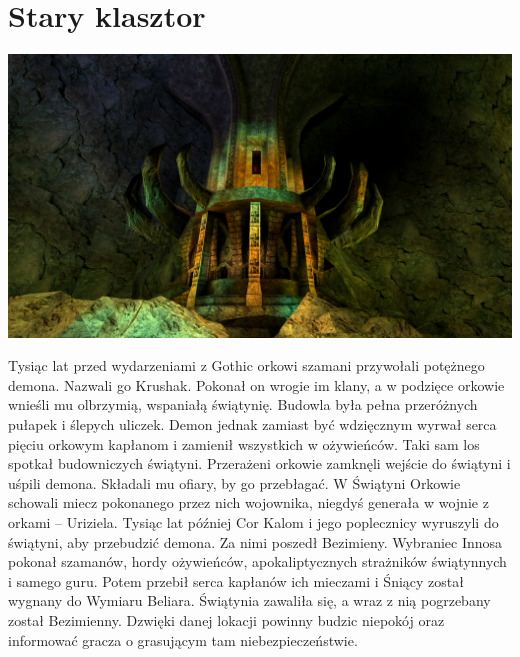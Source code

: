 \documentclass[11pt,polish, openany]{book}
\begin{document}
\section{Stary klasztor}
\begin{center}
	\includegraphics[scale=0.25]{swiatyniasniacego}
\end{center}
Tysiąc lat przed wydarzeniami z Gothic orkowi szamani przywołali potężnego demona. Nazwali go Krushak. Pokonał on wrogie im klany, a w podzięce orkowie wnieśli mu olbrzymią, wspaniałą świątynię. Budowla była pełna przeróżnych pułapek i ślepych uliczek. Demon jednak zamiast być wdzięcznym wyrwał serca pięciu orkowym kapłanom i zamienił wszystkich w ożywieńców. Taki sam los spotkał budowniczych świątyni. Przerażeni orkowie zamknęli wejście do świątyni i uśpili demona. Składali mu ofiary, by go przebłagać. W Świątyni Orkowie schowali miecz pokonanego przez nich wojownika, niegdyś generała w wojnie z orkami – Uriziela. Tysiąc lat później Cor Kalom i jego poplecznicy wyruszyli do świątyni, aby przebudzić demona. Za nimi poszedł Bezimieny. Wybraniec Innosa pokonał szamanów, hordy ożywieńców, apokaliptycznych strażników świątynnych i samego guru. Potem przebił serca kapłanów ich mieczami i Śniący został wygnany do Wymiaru Beliara. Świątynia zawaliła się, a wraz z nią pogrzebany został Bezimienny.
Dzwięki danej lokacji powinny budzic niepokój oraz informować gracza o grasującym tam niebezpieczeństwie.
\end{document}
